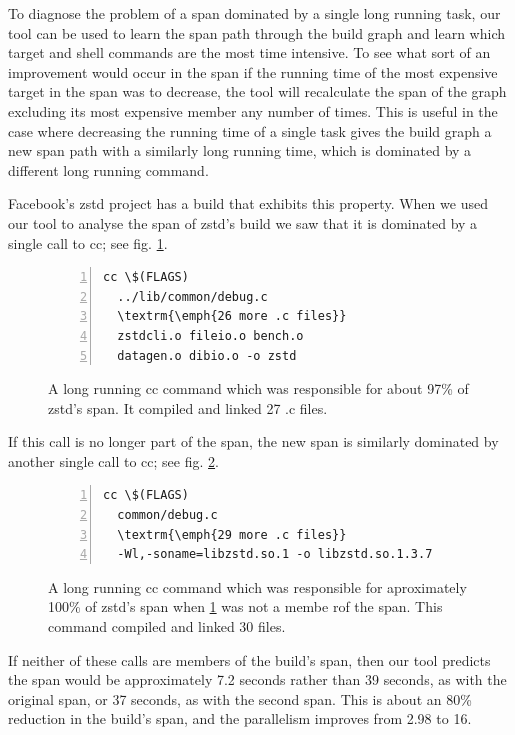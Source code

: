 \documentclass[sigconf,10pt,review,authorversion]{acmart}\settopmatter{printfolios=true,printccs=false,printacmref=false}
\begin{document}
To diagnose the problem of a span dominated by a single long running task, our tool can be used
to learn the span path through the build graph and learn which target and shell commands
are the most time intensive.  To see what sort of an improvement would occur in the span if the
running time of the most expensive target in the span was to decrease, the tool will recalculate
the span of the graph excluding its most expensive member any number of times.  This is useful
in the case where decreasing the running time of a single task gives the build graph a new span
path with a similarly long running time, which is dominated by a different long running command.

Facebook's zstd project \cite{zstd1.3.7} has a build that exhibits this property.  When we used our tool to analyse
the span of zstd's build we saw that it is dominated by a single call to cc; see fig. \ref{code:cc1}.

\begin{figure}[H]
\begin{Verbatim}[commandchars=\\\{\},codes={\catcode`$=3\catcode`^=7\catcode`_=8},fontsize=\small,numbers=left,xleftmargin=5mm]
  cc \$(FLAGS)
  ../lib/common/debug.c
  \textrm{\emph{26 more .c files}}
  zstdcli.o fileio.o bench.o
  datagen.o dibio.o -o zstd
\end{Verbatim}
\caption{A long running cc command which was responsible for about 97\% of zstd's span.  It compiled and linked 27 .c files.}
\label{code:cc1}
\end{figure}

If this call is no longer part of the span, the new span is similarly dominated by another single call to cc;
see fig. \ref{code:cc2}.
\begin{figure}[H]
\begin{Verbatim}[commandchars=\\\{\},codes={\catcode`$=3\catcode`^=7\catcode`_=8},fontsize=\small,numbers=left,xleftmargin=5mm]
  cc \$(FLAGS)
  common/debug.c
  \textrm{\emph{29 more .c files}}
  -Wl,-soname=libzstd.so.1 -o libzstd.so.1.3.7
\end{Verbatim}
\caption{A long running cc command which was responsible for aproximately 100\% of zstd's span when \ref{code:cc1} was not a membe rof the span.
This command compiled and linked 30 files.}
\label{code:cc2}
\end{figure}

If neither of these calls are members of the build's span, then our tool predicts the span would be
approximately 7.2 seconds rather than 39 seconds, as with the original span, or 37 seconds, as with the second span.
This is about an 80\% reduction in the build's span, and the parallelism improves from 2.98 to 16.
\end{document}
